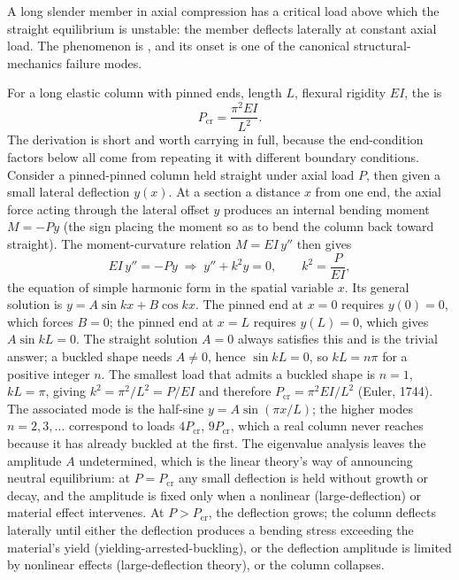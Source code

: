 A long slender member in axial compression has a critical load above
which the straight equilibrium is unstable: the member deflects
laterally at constant axial load. The phenomenon is ,
and its onset is one of the canonical structural-mechanics failure
modes.

For a long elastic column with pinned ends, length $L$, flexural
rigidity $EI$, the  is
\[
P_{\text{cr}} = \frac{\pi^2 EI}{L^2}.
\]
The derivation is short and worth carrying in full, because the
end-condition factors below all come from repeating it with different
boundary conditions. Consider a pinned-pinned column held straight under
axial load $P$, then given a small lateral deflection $y(x)$. At a section
a distance $x$ from one end, the axial force acting through the lateral
offset $y$ produces an internal bending moment $M=-Py$ (the sign placing
the moment so as to bend the column back toward straight). The
moment-curvature relation $M=EI\,y''$ then gives
\[
EI\,y'' = -P y \;\Rightarrow\; y'' + k^2 y = 0, \qquad k^2 = \frac{P}{EI},
\]
the equation of simple harmonic form in the spatial variable $x$. Its
general solution is $y=A\sin kx + B\cos kx$. The pinned end at $x=0$
requires $y(0)=0$, which forces $B=0$; the pinned end at $x=L$ requires
$y(L)=0$, which gives $A\sin kL=0$. The straight solution $A=0$ always
satisfies this and is the trivial answer; a buckled shape needs $A\neq0$,
hence $\sin kL=0$, so $kL=n\pi$ for a positive integer $n$. The smallest
load that admits a buckled shape is $n=1$, $kL=\pi$, giving
$k^2=\pi^2/L^2=P/EI$ and therefore $P_{\text{cr}}=\pi^2 EI/L^2$ (Euler,
1744). The associated mode is the half-sine $y=A\sin(\pi x/L)$; the higher
modes $n=2,3,\dots$ correspond to loads $4P_{\text{cr}}$, $9P_{\text{cr}}$,
which a real column never reaches because it has already buckled at the
first. The eigenvalue analysis leaves the amplitude $A$ undetermined,
which is the linear theory's way of announcing neutral equilibrium: at
$P=P_{\text{cr}}$ any small deflection is held without growth or decay,
and the amplitude is fixed only when a nonlinear (large-deflection) or
material effect intervenes. At $P > P_{\text{cr}}$, the deflection grows;
the column deflects laterally until either the deflection produces a
bending stress exceeding the material's yield (yielding-arrested-buckling),
or the deflection amplitude is limited by nonlinear effects
(large-deflection theory), or the column collapses.


